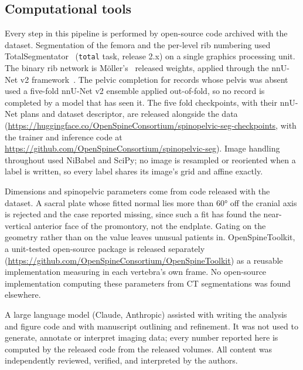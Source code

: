\documentclass[aapm,mph,amsmath,amssymb,reprint]{revtex4-2}
\newif\ifreview \reviewfalse
\newcommand{\Toolkit}{\ifreview An open-source measurement toolkit\else OpenSpineToolkit, a unit-tested open-source package\fi}
\begin{document}
\subsection{Computational tools}\label{sec:tools}

Every step in this pipeline is performed by open-source code archived with the dataset.
Segmentation of the femora and the per-level rib numbering used TotalSegmentator~\cite{totalsegmentator} (\texttt{total} task,
release 2.x) on a single graphics processing unit. The binary rib network is
M\"oller's~\cite{moller2026} released weights, applied through the nnU-Net v2
framework~\cite{nnunet}. The pelvic completion for records whose pelvis was absent used a five-fold nnU-Net v2 ensemble
applied out-of-fold, so no record is completed by a model that has seen it. The five fold
checkpoints, with their nnU-Net plans and dataset descriptor, are released alongside the
data (\ifreview the repository URL identifies the authors; it is on the title page and will be
restored here for the camera-ready version\else\url{https://huggingface.co/OpenSpineConsortium/spinopelvic-seg-checkpoints}, with the trainer and inference code at \url{https://github.com/OpenSpineConsortium/spinopelvic-seg}\fi). Image handling throughout used NiBabel and SciPy; no image is resampled or reoriented when a
label is written, so every label shares its image's grid and affine exactly.

Dimensions and spinopelvic parameters come from code released with the
dataset. A sacral plate whose fitted normal lies more than 60\si{\degree} off the cranial axis is
rejected and the case reported missing, since such a fit has found the near-vertical anterior
face of the promontory, not the endplate. Gating on the geometry rather than on the
value leaves unusual patients in. \Toolkit{} is released separately
(\ifreview the URL identifies the authors and is on the title page\else\url{https://github.com/OpenSpineConsortium/OpenSpineToolkit}\fi)
as a reusable implementation measuring in each vertebra's own frame. No open-source
implementation computing these parameters from CT segmentations was found elsewhere.

A large language model (Claude, Anthropic) assisted
with writing the analysis and figure code and with manuscript outlining and refinement. It was
not used to generate, annotate or interpret imaging data; every number reported here is computed by the released code from the
released volumes. All content was independently reviewed, verified, and interpreted by the authors.
\end{document}

